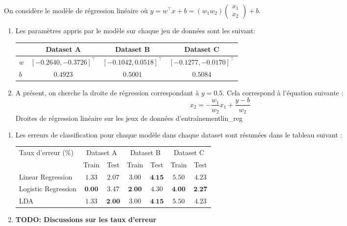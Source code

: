 \documentclass{article}
\begin{document}
On considère le modèle de régression linéaire où $y = w^\intercal x + b = (w_1 w_2) \begin{pmatrix}x_1\\x_2\end{pmatrix} + b$.
\begin{enumerate}[label=(\alph*)]
\item Les paramètres appris par le modèle sur chaque jeu de données sont les suivant:
\begin{center}
\begin{tabular}{|l|c|c|c|}
\hline
    & Dataset A & Dataset B & Dataset C\\
\hline
$w$ & $[-0.2640, -0.3726]^\intercal$ & $[-0.1042, 0.0518]^\intercal$& $[-0.1277, -0.0170]^\intercal$\\
\hline
$b$ & $0.4923$ & $0.5001$ & $0.5084$\\
\hline
\end{tabular}
\end{center}

\item A présent, on cherche la droite de régression correspondant à $y=0.5$. Cela correspond à l'équation suivante :
$$ x_2 = -\frac{w_1}{w_2}x_1 + \frac{y-b}{w_2} $$
          {}
          {}
          {Droites de régression linéaire sur les jeux de données d'entraînement}{lin_reg}
\end{enumerate}


\begin{enumerate}[label=(\alph*)]
\item Les erreurs de classification pour chaque modèle dans chaque dataset sont résumées dans le tableau suivant :
\begin{center}
\begin{tabular}{|l|c|c|c|c|c|c|}
\hline
\multirow{2}{*}{Taux d'erreur (\%)} & \multicolumn{2}{c|}{Dataset A} & \multicolumn{2}{c|}{Dataset B} & \multicolumn{2}{c|}{Dataset C}\\
& Train & Test & Train & Test & Train & Test\\
\hline
Linear Regression & $1.33$ & $2.07$ & $3.00$ & $\textbf{4.15}$ & $5.50$ & $4.23$\\
\hline
Logistic Regression & $\textbf{0.00}$ & $3.47$ & $\textbf{2.00}$ & $4.30$ & $\textbf{4.00}$ & $\textbf{2.27}$\\
\hline
LDA & $1.33$ & $\textbf{2.00}$ & $3.00$ & $\textbf{4.15}$ & $5.50$ & $4.23$\\
\hline
\end{tabular}
\end{center}

\item \textbf{TODO: Discussions sur les taux d'erreur}
\end{enumerate}
\end{document}
